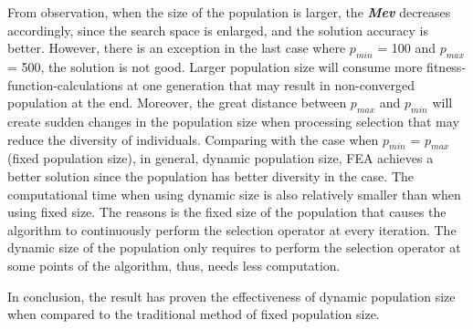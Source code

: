 \documentclass[final]{elsarticle}
\begin{document}
From observation, when the size of the population is larger, the \textit{\textbf{Mev}} decreases accordingly, since the search space is enlarged, and the solution accuracy is better. However, there is an exception in the last case where $p_{min}$ = 100 and $p_{max}$ = 500, the solution is not good. Larger population size will consume more fitness-function-calculations at one generation that may result in non-converged population at the end. Moreover, the great distance between \textbf{$p_{max}$} and $p_{min}$ will create sudden changes in the population size when processing selection that may reduce the diversity of individuals. Comparing with the case when $p_{min} $ = $ p_{max} $ (fixed population size), in general, dynamic population size, FEA achieves a better solution since the population has better diversity in the case. The computational time when using dynamic size is also relatively smaller than when using fixed size. The reasons is the fixed size of the population that causes the algorithm to continuously perform the selection operator at every iteration. The dynamic size of the population only requires to perform the selection operator at some points of the algorithm, thus, needs less computation. 

In conclusion, the result has proven the effectiveness of dynamic population size when compared to the traditional method of fixed population size. 
%
\end{document}
